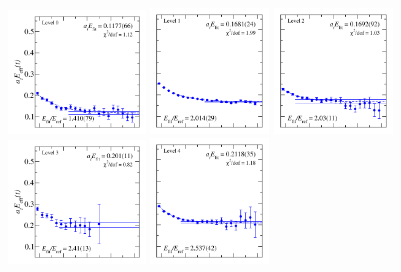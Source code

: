 \begin{figure}
  \includegraphics[width=0.325\textwidth]{figures/spectrum_a1gm/with_tq/fits/fit_0.pdf}
  \includegraphics[width=0.28\textwidth]{figures/spectrum_a1gm/with_tq/fits/fit_2.pdf}
  \includegraphics[width=0.28\textwidth]{figures/spectrum_a1gm/with_tq/fits/fit_1.pdf}\\
  \includegraphics[width=0.325\textwidth]{figures/spectrum_a1gm/with_tq/fits/fit_3.pdf}
  \includegraphics[width=0.28\textwidth]{figures/spectrum_a1gm/with_tq/fits/fit_4.pdf}

\end{figure}
